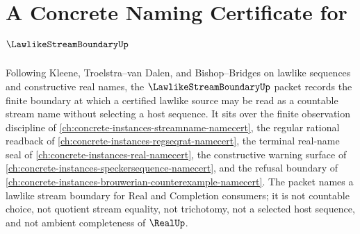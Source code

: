 \chapter{A Concrete Naming Certificate for $\LawlikeStreamBoundaryUp$}
\label{ch:concrete-instances-lawlike-stream-boundary-namecert}

Following Kleene, Troelstra--van Dalen, and Bishop--Bridges on lawlike sequences and constructive real names, the $\LawlikeStreamBoundaryUp$ packet records the finite boundary at which a certified lawlike source may be read as a countable stream name without selecting a host sequence. It sits over the finite observation discipline of \autoref{ch:concrete-instances-streamname-namecert}, the regular rational readback of \autoref{ch:concrete-instances-regseqrat-namecert}, the terminal real-name seal of \autoref{ch:concrete-instances-real-namecert}, the constructive warning surface of \autoref{ch:concrete-instances-speckersequence-namecert}, and the refusal boundary of \autoref{ch:concrete-instances-brouwerian-counterexample-namecert}. The packet names a lawlike stream boundary for Real and Completion consumers; it is not countable choice, not quotient stream equality, not trichotomy, not a selected host sequence, and not ambient completeness of $\RealUp$.

